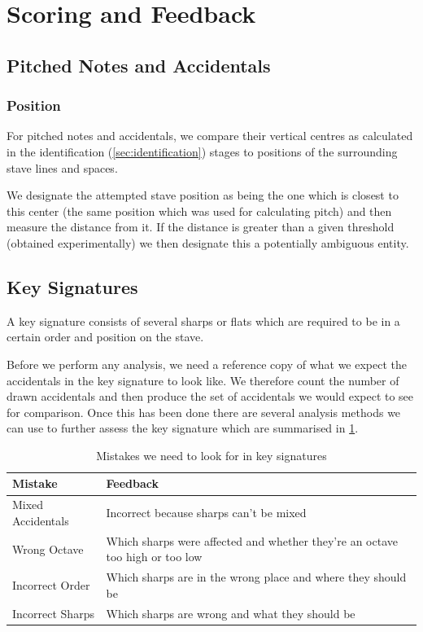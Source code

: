 \section{Scoring and Feedback}
\label{sec:scoring}

\subsection{Pitched Notes and Accidentals}
\label{sec:pitched-notes-accidentals}

\subsubsection{Position}

For pitched notes and accidentals, we compare their vertical centres as calculated in the identification (\cref{sec:identification}) stages to positions of the surrounding stave lines and spaces.

We designate the attempted stave position as being the one which is closest to this center (the same position which was used for calculating pitch) and then measure the distance from it. If the distance is greater than a given threshold (obtained experimentally) we then designate this a potentially ambiguous entity.

\subsection{Key Signatures}

A key signature consists of several sharps or flats which are required to be in a certain order and position on the stave.

Before we perform any analysis, we need a reference copy of what we expect the accidentals in the key signature to look like. We therefore count the number of drawn accidentals and then produce the set of accidentals we would expect to see for comparison. Once this has been done there are several analysis methods we can use to further assess the key signature which are summarised in \cref{table:key-signature-errors}.

\begin{table}[H]
    \renewcommand{\arraystretch}{1.6}
    \begin{tabularx}{\textwidth}{ lX }
        \toprule
        Mistake & Feedback \\
        \midrule
        Mixed Accidentals & Incorrect because sharps can't be mixed \\
        Wrong Octave & Which sharps were affected and whether they're an octave too high or too low \\
        Incorrect Order & Which sharps are in the wrong place and where they should be \\
        Incorrect Sharps & Which sharps are wrong and what they should be \\
        \bottomrule
    \end{tabularx}

    \caption{Mistakes we need to look for in key signatures}
    \label{table:key-signature-errors}
\end{table}

